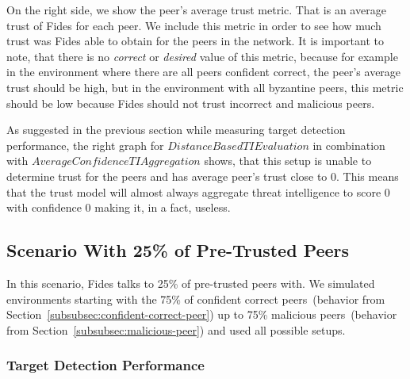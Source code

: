 On the right side, we show the peer's average trust metric. That is an average trust of Fides for each peer. We include this metric in order to see how much trust was Fides able to obtain for the peers in the network.
It is important to note, that there is no \textit{correct} or \textit{desired} value of this metric, because for example in the environment where there are all peers confident correct, the peer's average trust should be high, but in the environment with all byzantine peers, this metric should be low because Fides should not trust incorrect and malicious peers.

As suggested in the previous section while measuring target detection performance, the right graph for $DistanceBasedTIEvaluation$ in combination with $AverageConfidenceTIAggregation$ shows, that this setup is unable to determine trust for the peers and has average peer's trust close to $0$. This means that the trust model will almost always aggregate threat intelligence to score $0$ with confidence $0$ making it, in a fact, useless. 

\cleartoleftpage
\subsection{Scenario With 25\% of Pre-Trusted Peers}
\label{subsec:scenario-with-25-pretrusted-peers}

In this scenario, Fides talks to 25\% of pre-trusted peers with. We simulated environments starting with the 75\% of confident correct peers~(behavior from Section~\ref{subsubsec:confident-correct-peer}) up to 75\% malicious peers~(behavior from Section~\ref{subsubsec:malicious-peer}) and used all possible setups.

\subsubsection{Target Detection Performance}

